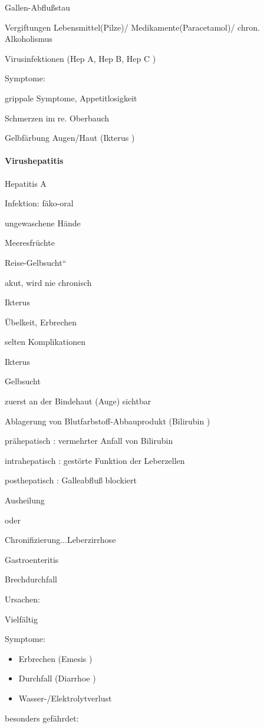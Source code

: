 \documentclass{article}
\begin{document}
Gallen-Abflu{\ss}stau

Vergiftungen Lebensmittel(Pilze)/  Medikamente(Paracetamol)/  chron. 
Alkoholismus

Virusinfektionen (Hep A,  Hep B, Hep C )

Symptome:

grippale Symptome, Appetitlosigkeit

Schmerzen im re. Oberbauch

Gelbf\"arbung Augen/Haut (Ikterus )

\paragraph{Virushepatitis}
Hepatitis A

Infektion: f\"ako-oral

ungewaschene H\"ande

Meeresfr\"uchte

{\quotedblbase}Reise-Gelbsucht{\textquotedblleft}

akut, wird nie chronisch

Ikterus

\"Ubelkeit, Erbrechen

selten Komplikationen

Ikterus

Gelbsucht

zuerst an der Bindehaut (Auge) sichtbar

Ablagerung von Blutfarbstoff-Abbauprodukt  (Bilirubin )

pr\"ahepatisch : vermehrter Anfall von Bilirubin

intrahepatisch : gest\"orte Funktion der  Leberzellen

posthepatisch : Galleabflu{\ss} blockiert

Ausheilung

 oder

Chronifizierung...Leberzirrhose

Gastroenteritis

Brechdurchfall

Ursachen:

Vielf\"altig

Symptome:

\begin{itemize}
\item Erbrechen (Emesis )

\item Durchfall (Diarrhoe )

\item Wasser-/Elektrolytverlust

\end{itemize}
besonders gef\"ahrdet:
\end{document}
